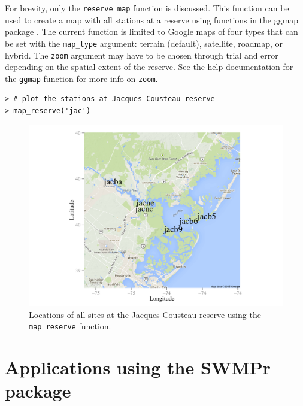 \documentclass[10pt,letterpaper]{article}\usepackage[]{graphicx}\usepackage[]{color}
\makeatletter
\def\maxwidth{ %
  \ifdim\Gin@nat@width>\linewidth
    \linewidth
  \else
    \Gin@nat@width
  \fi
}
\newenvironment{kframe}{%
 \def\at@end@of@kframe{}%
 \ifinner\ifhmode%
  \def\at@end@of@kframe{\end{minipage}}%
  \begin{minipage}{\columnwidth}%
 \fi\fi%
 \def\FrameCommand##1{\hskip\@totalleftmargin \hskip-\fboxsep
 \colorbox{shadecolor}{##1}\hskip-\fboxsep
     \hskip-\linewidth \hskip-\@totalleftmargin \hskip\columnwidth}%
 \MakeFramed {\advance\hsize-\width
   \@totalleftmargin\z@ \linewidth\hsize
   \@setminipage}}%
 {\par\unskip\endMakeFramed%
 \at@end@of@kframe}
\newenvironment{knitrout}{}{} %
\makeatother
\begin{document}
For brevity, only the \texttt{reserve\_map} function is discussed.  This function can be used to create a map with all stations at a reserve using functions in the ggmap package \cite{Kahle13}. The current function is limited to Google maps of four types that can be set with the \texttt{map\_type} argument: terrain (default), satellite, roadmap, or hybrid.  The \texttt{zoom} argument may have to be chosen through trial and error depending on the spatial extent of the reserve.  See the help documentation for the \texttt{ggmap} function for more info on \texttt{zoom}.

\begin{knitrout}\small
{}\color{fgcolor}\begin{kframe}
\begin{verbatim}
> # plot the stations at Jacques Cousteau reserve
> map_reserve('jac')
\end{verbatim}
\end{kframe}\begin{figure}[!ht]


{\centering \includegraphics[width=\maxwidth]{figure/map_ex} 

}

\caption[Locations of all sites at the Jacques Cousteau reserve using the \texttt{map\_reserve} function]{Locations of all sites at the Jacques Cousteau reserve using the \texttt{map\_reserve} function.\label{fig:map_ex}}
\end{figure}


\end{knitrout}

\section*{Applications using the SWMPr package}
\label{swmp_apps}
\end{document}
